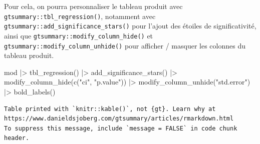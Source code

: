 \documentclass[
  letterpaper,
  DIV=11,
  numbers=noendperiod,
  oneside]{scrreprt}
\newenvironment{Shaded}{\begin{snugshade}}{\end{snugshade}}
\newcommand{\FunctionTok}[1]{\textcolor[rgb]{0.28,0.35,0.67}{#1}}
\newcommand{\NormalTok}[1]{\textcolor[rgb]{0.00,0.23,0.31}{#1}}
\newcommand{\SpecialCharTok}[1]{\textcolor[rgb]{0.37,0.37,0.37}{#1}}
\newcommand{\StringTok}[1]{\textcolor[rgb]{0.13,0.47,0.30}{#1}}
\begin{document}
Pour cela, on pourra personnaliser le tableau produit avec
\texttt{gtsummary::tbl\_regression()}, notamment avec
\texttt{gtsummary::add\_significance\_stars()} pour l'ajout des étoiles
de significativité, ainsi que \texttt{gtsummary::modify\_column\_hide()}
et \texttt{gtsummary::modify\_column\_unhide()} pour afficher / masquer
les colonnes du tableau produit.

\begin{Shaded}
\begin{Highlighting}[]
\NormalTok{mod }\SpecialCharTok{|\textgreater{}} 
  \FunctionTok{tbl\_regression}\NormalTok{() }\SpecialCharTok{|\textgreater{}} 
  \FunctionTok{add\_significance\_stars}\NormalTok{() }\SpecialCharTok{|\textgreater{}} 
  \FunctionTok{modify\_column\_hide}\NormalTok{(}\FunctionTok{c}\NormalTok{(}\StringTok{"ci"}\NormalTok{, }\StringTok{"p.value"}\NormalTok{)) }\SpecialCharTok{|\textgreater{}} 
  \FunctionTok{modify\_column\_unhide}\NormalTok{(}\StringTok{"std.error"}\NormalTok{) }\SpecialCharTok{|\textgreater{}} 
  \FunctionTok{bold\_labels}\NormalTok{()}
\end{Highlighting}
\end{Shaded}

\begin{verbatim}
Table printed with `knitr::kable()`, not {gt}. Learn why at
https://www.danieldsjoberg.com/gtsummary/articles/rmarkdown.html
To suppress this message, include `message = FALSE` in code chunk header.
\end{verbatim}
\end{document}
